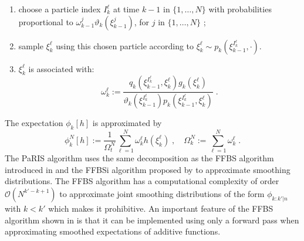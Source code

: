 \documentclass[12pt]{article}
\newcommand{\eqsp}{\;}
\newcommand{\1}{\mathrm{1}}
\newcommand{\qk}{q_{k}}
\begin{document}
\begin{enumerate}
\item choose a particle index $I^{\ell}_k$ at time $k-1$ in $\{1,\ldots,N\}$ with probabilities proportional to $\omega_{k-1}^{j} \vartheta_k (\xi^{j}_{k-1})$, for $j$ in $\{1,\ldots,N\}$ ;
\item sample  $\xi^{\ell}_{k}$ using this chosen particle according to $\xi^{\ell}_{k} \sim p_k(\xi^{I^{\ell}_k}_{k-1},\cdot)$.
\item $\xi^{\ell}_k$ is associated with:
\[
\omega^{\ell}_k := \frac{\qk(\xi_{k-1}^{I^{\ell}_k},\xi^{\ell}_k)g_k(\xi^{\ell}_k)}{\vartheta_k(\xi^{I^{\ell}_k}_{k-1}) p_k (\xi_{k-1}^{I^{\ell}_k},\xi^{\ell}_k)}\eqsp.
\]
\end{enumerate} 
The expectation $\phi_{k}[h]$ is approximated by
\[
\phi^N_{k}[h] := \frac{1}{\Omega_t^N} \sum_{\ell=1}^N \omega_k^{\ell} h \left(\xi^{\ell}_k \right)\eqsp,\quad\Omega_k^N:= \sum_{\ell=1}^N \omega_k^{\ell}\eqsp.
\]
The PaRIS algorithm uses the same decomposition as the FFBS algorithm introduced in \cite{doucetgodsillandrieu:2000} and the FFBSi algorithm proposed by \cite{godsill:doucet:west:2004} to approximate smoothing distributions. 
The FFBS algorithm has a computational complexity of order $\mathcal{O}(N^{k'-k+1})$ to approximate joint smoothing distributions of the form $\phi_{k:k'|n}$ with $k<k'$ which makes it prohibitive. An important feature of the FFBS algorithm shown in \cite{mongillo:deneve:2008,cappe:2011,delmoral:doucet:singh:2010} is that it can be implemented using only a forward pass when approximating smoothed expectations of additive functions. 
\end{document}
